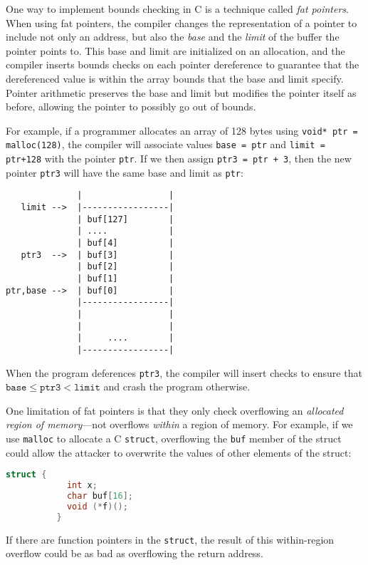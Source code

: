 One way to implement bounds checking in C is a technique called \emph{fat pointers}.
When using fat pointers, the compiler changes the representation of a
pointer to include not only an address, but also the \emph{base} and the 
\emph{limit} of the buffer the pointer points to.
This base and limit are initialized on an allocation, and the compiler inserts bounds checks on each pointer dereference to guarantee that the dereferenced value is within the array bounds that the base and limit specify.
 Pointer arithmetic preserves the base and limit but modifies the pointer itself as before, allowing the pointer to possibly go out of bounds.

For example, if a programmer allocates an array of 128 bytes
using \texttt{void* ptr = malloc(128)}, the compiler will
associate values \texttt{base = ptr} and \texttt{limit = ptr+128}
with the pointer \texttt{ptr}.
If we then assign \texttt{ptr3 = ptr + 3}, then the new
pointer \texttt{ptr3} will have the same base and limit 
as \texttt{ptr}:
\begin{verbatim}
              |                 |
   limit -->  |-----------------|
              | buf[127]        |
              | ....            |
              | buf[4]          |
   ptr3  -->  | buf[3]          |
              | buf[2]          |
              | buf[1]          |
ptr,base -->  | buf[0]          |
              |-----------------|
              |                 |
              |                 |
              |     ....        |
              |-----------------|
\end{verbatim}
When the program deferences \texttt{ptr3}, the compiler will insert
checks to ensure that $\texttt{base} \leq \texttt{ptr3} < \texttt{limit}$
and crash the program otherwise.

One limitation of fat pointers is that they only check 
overflowing an \emph{allocated region of memory}---not overflows
\emph{within} a region of memory.
For example, if we use \texttt{malloc} to allocate a C \texttt{struct},
overflowing the \texttt{buf} member of the struct could allow the
attacker to overwrite the values of other elements of the struct:
\begin{lstlisting}[language=c]
          struct {
            int x;
            char buf[16];
            void (*f)();
          }
\end{lstlisting}
If there are function pointers in the \texttt{struct}, the result
of this within-region overflow could be as bad as overflowing the return
address.

